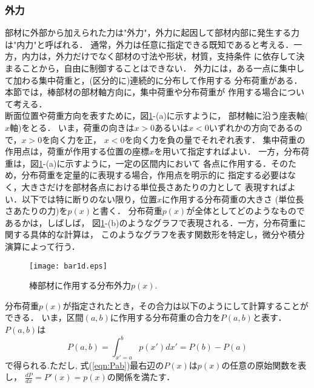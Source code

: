 \documentclass[10pt,a4j]{jarticle}
\begin{document}
\subsubsection{外力}
部材に外部から加えられた力は"外力"，外力に起因して部材内部に発生する力は"内力"と呼ばれる．
通常，外力は任意に指定できる既知であると考える．一方，内力は，外力だけでなく部材の寸法や形状，材質，支持条件
に依存して決まることから，自由に制御することはできない．
外力には，ある一点に集中して加わる集中荷重と，(区分的に)連続的に分布して作用する
分布荷重がある．本節では，棒部材の部材軸方向に，集中荷重や分布荷重が
作用する場合について考える．\\
断面位置や荷重方向を表すために，図\ref{fig:fig0}-(a)に示すように， 
部材軸に沿う座表軸($x$軸)をとる．
いま，荷重の向きは$x>0$あるいは$x<0$いずれかの方向であるので，$x>0$を向く力を正，
$x<0$を向く力を負の量でそれぞれ表す．
集中荷重の作用点は，荷重が作用する位置の座標$x$を用いて指定すればよい．
一方，分布荷重は，図\ref{fig:fig0}-(a)に示すように，一定の区間内において
各点に作用する．そのため，分布荷重を定量的に表現する場合，作用点を明示的に
指定する必要はなく，大きさだけを部材各点における単位長さあたりの力として
表現すればよい．以下では特に断りのない限り，位置$x$に作用する分布荷重の大きさ
(単位長さあたりの力)を$p(x)$と書く．
分布荷重$p(x)$が全体としてどのようなものであるかは，しばしば，
図\ref{fig:fig0}-(b)のようなグラフで表現される．一方，分布荷重に関する具体的な計算は，
このようなグラフを表す関数形を特定し，微分や積分演算によって行う．
\begin{figure}[h]
	\begin{center}
	\texttt{[image: bar1d.eps]} 
	\end{center}
	\caption{棒部材に作用する分布外力$p(x)$.} 
	\label{fig:fig0}
\end{figure}

分布荷重$p(x)$が指定されたとき，その合力は以下のようにして計算することができる．
いま，区間$(a,b)$に作用する分布荷重の合力を$P(a,b)$と表す．$P(a,b)$は
\begin{equation}
	P(a,b)=\int_{x'=a}^{b}p(x')dx'=P(b)-P(a)
	\label{eqn:Pab}
\end{equation}
で得られる.ただし, 式(\ref{eqn:Pab})最右辺の$P(x)$は$p(x)$の任意の原始関数を表し，
$\frac{dP}{dx}=P'(x)=p(x)$の関係を満たす．
\end{document}

